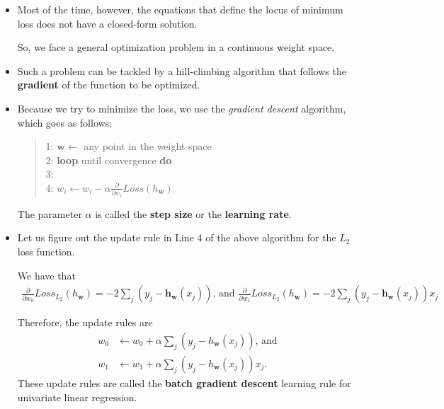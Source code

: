 \documentclass[10pt]{article}
\begin{document}
\begin{itemize}
    \item Most of the time, however, the equations that define
        the locus of minimum loss does not have a closed-form
        solution. 
        
        So, we face a general optimization problem in a 
        continuous weight space.
        
    \item Such a problem can be tackled by a hill-climbing 
        algorithm that follows the {\bf gradient} of the
        function to be optimized.
        
    \item Because we try to minimize the loss, we use 
        the \emph{gradient descent} algorithm, which goes 
        as follows:
    
        \begin{quote}
            1: $\mathbf{w} \gets$ any point in the weight space\\
            2: {\bf loop} until convergence {\bf do}\\
            3: \\
            4: \qquad \qquad $w_i \gets w_i - \alpha \frac{\partial}{\partial w_i}Loss(h_\mathbf{w})$
        \end{quote}
        
        The parameter $\alpha$ is called the {\bf step size}
        or the {\bf learning rate}.
        
    \item Let us figure out the update rule in Line 4 of 
        the above algorithm for the $L_2$ loss function.
        
        We have that
        \begin{align*}
            \frac{\partial}{\partial w_0} Loss_{L_2}(h_\mathbf{w})
            = -2 \sum_{j}(y_j - \mathbf{h_\mathbf{w}}(x_j))
            \mbox{, and }
            \frac{\partial}{\partial w_1} Loss_{L_2}(h_\mathbf{w})
            = -2 \sum_{j}(y_j - \mathbf{h_\mathbf{w}}(x_j))x_j
        \end{align*}
        
        Therefore, the update rules are
        \begin{align*}
            w_0 &\gets w_0 + \alpha \sum_{j}(y_j - h_\mathbf{w}(x_j))\mbox{, and}\\
            w_1 &\gets w_1 + \alpha \sum_{j}(y_j - h_\mathbf{w}(x_j))x_j.
        \end{align*}
        These update rules are called the 
        {\bf batch gradient descent} learning rule 
        for univariate linear regression.
        

\end{itemize}
\end{document}
